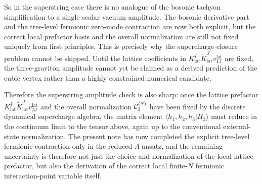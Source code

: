\documentclass[11pt]{article}
\numberwithin{equation}{section}
\begin{document}
So in the superstring case there is no analogue of the bosonic tachyon simplification to a single scalar vacuum amplitude. The bosonic derivative part and the tree-level fermionic zero-mode contraction are now both explicit, but the correct local prefactor basis and the overall normalization are still not fixed uniquely from first principles. This is precisely why the supercharge-closure problem cannot be skipped. Until the lattice coefficients in $K^I_{\mathrm{lat}}\widetilde K^J_{\mathrm{lat}}v^{\mathrm{lat}}_{IJ}$ are fixed, the three-graviton amplitude cannot yet be claimed as a derived prediction of the cubic vertex rather than a highly constrained numerical candidate.

Therefore the superstring amplitude check is also sharp: once the lattice prefactor $K^I_{\mathrm{lat}}\widetilde K^J_{\mathrm{lat}}v_{IJ}^{\mathrm{lat}}$ and the overall normalization ${\cal C}_3^{(S)}$ have been fixed by the discrete dynamical supercharge algebra, the matrix element $\langle h_1,h_2,h_3|H_3\rangle$ must reduce in the continuum limit to the tensor above, again up to the conventional external-state normalization. The present note has now completed the explicit tree-level fermionic contraction only in the reduced $\Lambda$ ansatz, and the remaining uncertainty is therefore not just the choice and normalization of the local lattice prefactor, but also the derivation of the correct local finite-$N$ fermionic interaction-point variable itself.
\end{document}
